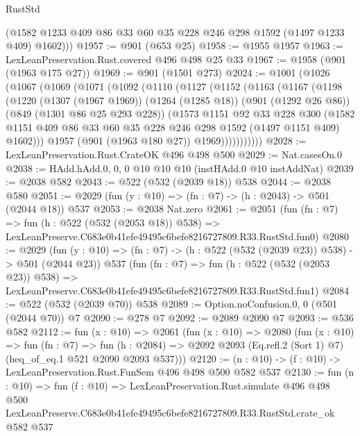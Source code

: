 \begin{lexlean}{RustStd}
\begin{coremodule}
        (@1582 @1233 @409 @86 @33 @60 @35 @228 @246 @298 @1592 (@1497 @1233 @409) @1602)))
@1957 := @901 (@653 @25)
@1958 := @1955 @1957
@1963 := LexLeanPreservation.Rust.covered @496 @498 @25 @33
@1967 := @1958 (@901 (@1963 @175 @27))
@1969 := @901 (@1501 @273)
@2024 := @1001
    (@1026
      (@1067
        (@1069
          (@1071
            (@1092
              (@1110
                (@1127
                  (@1152
                    (@1163
                      (@1167
                        (@1198
                          (@1220
                            (@1307 (@1967 @1969))
                            (@1264 (@1285 @18))
                            (@901 (@1292 @26 @86))
                            (@849 (@1301 @86 @25 @293 @228))
                            (@1573
                              @1151
                              @92
                              @33
                              @228
                              @300
                              (@1582
                                @1151
                                @409
                                @86
                                @33
                                @60
                                @35
                                @228
                                @246
                                @298
                                @1592
                                (@1497 @1151 @409)
                                @1602)))
                          @1957
                          (@901 (@1963 @180 @27))
                          @1969)))))))))))
@2028 := LexLeanPreservation.Rust.CrateOK @496 @498 @500
@2029 := Nat.casesOn.{0}
@2038 := HAdd.hAdd.{0, 0, 0} @10 @10 @10 (instHAdd.{0} @10 instAddNat)
@2039 := @2038 @582
@2043 := @522 (@532 (@2039 @18)) @538
@2044 := @2038 @580
@2051 := @2029 (fun (y : @10) => (fn : @7) -> (h : @2043) -> @501 (@2044 @18)) @537
@2053 := @2038 Nat.zero
@2061 := @2051
    (fun (fn : @7) =>
    fun (h : @522 (@532 (@2053 @18)) @538) =>
    LexLeanPreserve.C683e0b41efe49495c6befe8216727809.R33.RustStd.fun0)
@2080 := @2029
    (fun (y : @10) => (fn : @7) -> (h : @522 (@532 (@2039 @23)) @538) -> @501 (@2044 @23))
    @537
    (fun (fn : @7) =>
    fun (h : @522 (@532 (@2053 @23)) @538) =>
    LexLeanPreserve.C683e0b41efe49495c6befe8216727809.R33.RustStd.fun1)
@2084 := @522 (@532 (@2039 @70)) @538
@2089 := Option.noConfusion.{0, 0} (@501 (@2044 @70)) @7
@2090 := @278 @7
@2092 := @2089 @2090 @7
@2093 := @536 @582
@2112 := fun (x : @10) =>
  @2061
    (fun (x : @10) =>
    @2080
      (fun (x : @10) =>
      fun (fn : @7) =>
      fun (h : @2084) =>
      @2092 @2093 (Eq.refl.{2} (Sort 1) @7) (heq_of_eq.{1} @521 @2090 @2093 @537)))
@2120 := (n : @10) -> (f : @10) -> LexLeanPreservation.Rust.FunSem @496 @498 @500 @582 @537
@2130 := fun (n : @10) =>
  fun (f : @10) =>
  LexLeanPreservation.Rust.simulate
    @496
    @498
    @500
    LexLeanPreserve.C683e0b41efe49495c6befe8216727809.R33.RustStd.crate_ok
    @582
    @537
\end{coremodule}
\end{lexlean}
